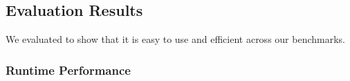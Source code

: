 \subsection{\sys Evaluation Results}
\label{sec:results_evaluation}

We evaluated \sys to show that it is easy to use and efficient across our
benchmarks. %

%


\subsubsection{\sys Runtime Performance}
\label{sec:result_coalescing}

